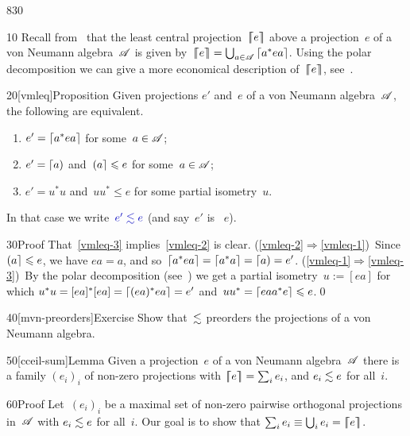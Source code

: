 \begin{parsec}{830}%
\begin{point}{10}%
Recall from~
that the least central projection~$\left\lceil\!\!\left\lceil e\right\rceil\!\!\right\rceil$
above a projection~$e$ of a von Neumann algebra~$\mathscr{A}$
is given by~$\left\lceil\!\!\left\lceil e\right\rceil\!\!\right\rceil=\bigcup_{a\in \mathscr{A}}\left\lceil a^* e a\right\rceil$.
Using the polar decomposition
we can give a more economical
description of~$\left\lceil\!\!\left\lceil e\right\rceil\!\!\right\rceil$,
see~.
\end{point}
\begin{point}{20}[vmleq]{Proposition}%
Given projections $e'$ and~$e$
of a von Neumann algebra~$\mathscr{A}$,
the following are equivalent.
\begin{enumerate}
\item
\label{vmleq-1}
$e'= \left\lceil a^*e a\right\rceil$ for some~$a\in\mathscr{A}$;
\item
\label{vmleq-2}
$e' = \left\lceil a\right)$ and~$\left(a\right\rceil\leqslant e$
for some~$a\in\mathscr{A}$;
\item
\label{vmleq-3}
$e' = u^*u$ and~$uu^*\leq e$
for some partial isometry~$u$.
\end{enumerate}
In that case
we write~$\Define{e'\vmleq e}$%
(and say~$e'$ is ~$e$).%
\begin{point}{30}{Proof}%
That~\ref{vmleq-3}
implies~\ref{vmleq-2} is clear.
(\ref{vmleq-2}$\Rightarrow$\ref{vmleq-1})\ 
Since~$\left(a\right\rceil\leqslant e$,
we have $ea=a$,
and so~$\left\lceil a^*ea\right\rceil=\left\lceil a^*a\right\rceil=\left\lceil a\right)=e'$.
(\ref{vmleq-1}$\Rightarrow$\ref{vmleq-3})\ 
By the polar decomposition (see~)
we get a partial isometry~$u:=[ea]$
for which $u^*u = [ea]^*[ea]=\left\lceil(ea)^*ea\right\rceil=e'$
and~$uu^*=\left\lceil eaa^*e\right\rceil\leqslant e$.\qed
\end{point}
\end{point}
\begin{point}{40}[mvn-preorders]{Exercise}%
Show that~$\vmleq$  preorders
the projections of a von Neumann algebra.
\end{point}
\begin{point}{50}[cceil-sum]{Lemma}%
%
Given a projection~$e$
of a von Neumann algebra~$\mathscr{A}$
there is a family
$(e_i)_i$ of non-zero projections with $\left\lceil\!\!\left\lceil e\right\rceil\!\!\right\rceil=\sum_i e_i$,
and $e_i\vmleq e$ for all~$i$.
\begin{point}{60}{Proof}%
Let~$(e_i)_i$
be a maximal set of non-zero pairwise orthogonal projections
in~$\mathscr{A}$ with
$e_i\vmleq e$ for all~$i$.
Our goal is to show that $\sum_i e_i \equiv \bigcup_i e_i=\left\lceil\!\!\left\lceil e\right\rceil\!\!\right\rceil$.


\end{point}
\end{point}
\end{parsec}
